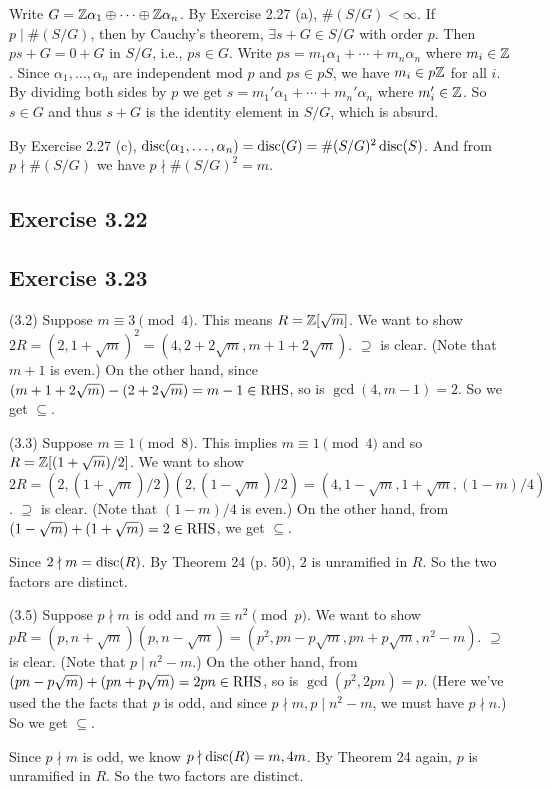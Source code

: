 \documentclass[../Marcus.tex]{subfiles}
\begin{document}
Write $G=\mathbb{Z}\alpha_1\oplus\cdots\oplus\mathbb{Z}\alpha_n$. By Exercise 2.27 (a), $\#(S/G)<\infty$. If $p\mid \#(S/G)$, then by Cauchy's theorem, $\exists s+G\in S/G$ with order $p$. Then $ps+G=0+G$ in $S/G$, i.e., $ps\in G$. Write $ps=m_1\alpha_1+\cdots+m_n\alpha_n$ where $m_i\in\mathbb{Z}$. Since $\alpha_1,\ldots,\alpha_n$ are independent mod $p$ and $ps\in pS$, we have $m_i\in p\mathbb{Z}$ for all $i$. By dividing both sides by $p$ we get $s=m_1'\alpha_1+\cdots+m_n'\alpha_n$ where $m'_i\in\mathbb{Z}$. So $s\in G$ and thus $s+G$ is the identity element in $S/G$, which is absurd.

By Exercise 2.27 (c), $\operatorname{disc}(\alpha_1,\ldots,\alpha_n)=\operatorname{disc}(G)=\#(S/G)^2\operatorname{disc}(S)$. And from $p\nmid \#(S/G)$ we have $p\nmid \#(S/G)^2=m$.

\subsection*{Exercise 3.22}

\subsection*{Exercise 3.23}

(3.2) Suppose $m\equiv 3\pmod{4}$. This means $R=\mathbb{Z}[\sqrt{m}]$. We want to show $2R=(2,1+\sqrt{m})^2=(4,2+2\sqrt{m},m+1+2\sqrt{m})$. $\supseteq$ is clear. (Note that $m+1$ is even.) On the other hand,
since $(m+1+2\sqrt{m})-(2+2\sqrt{m})=m-1\in\operatorname{RHS}$, so is $\gcd(4,m-1)=2$. So we get $\subseteq$.

(3.3) Suppose $m\equiv 1\pmod{8}$. This implies $m\equiv 1\pmod{4}$ and so $R=\mathbb{Z}[{(1+\sqrt{m})/2}]$. We want to show $2R=(2,(1+\sqrt{m})/2)(2,(1-\sqrt{m})/2)=(4,1-\sqrt{m},1+\sqrt{m},(1-m)/4)$. $\supseteq$ is clear. (Note that $(1-m)/4$ is even.) On the other hand, from $(1-\sqrt{m})+(1+\sqrt{m})=2\in\operatorname{RHS}$, we get $\subseteq$.

Since $2\nmid m=\operatorname{disc}(R)$. By Theorem 24 (p. 50), $2$ is unramified in $R$. So the two factors are distinct.

(3.5) Suppose $p\nmid m$ is odd and $m\equiv n^2\pmod{p}$. We want to show $pR=(p,n+\sqrt{m})(p,n-\sqrt{m})=(p^2,pn-p\sqrt{m},pn+p\sqrt{m},n^2-m)$. $\supseteq$ is clear. (Note that $p\mid n^2-m$.) On the other hand, from $(pn-p\sqrt{m})+(pn+p\sqrt{m})=2pn\in\operatorname{RHS}$, so is $\gcd(p^2,2pn)=p$. (Here we've used the the facts that $p$ is odd, and since $p\nmid m,p\mid n^2-m$, we must have $p\nmid n$.) So we get $\subseteq$.

Since $p\nmid m$ is odd, we know $p\nmid\operatorname{disc}(R)=m,4m$. By Theorem 24 again, $p$ is unramified in $R$. So the two factors are distinct.
\end{document}
